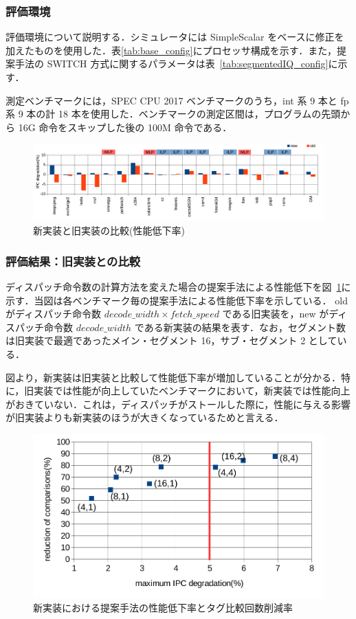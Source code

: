 \documentclass[twocolumn]{jsarticle}
\newcommand{\fig}[1]{{図~\ref{fig:#1}}}
\newcommand{\tab}[1]{{表~\ref{tab:#1}}}
\begin{document}
  \subsubsection{評価環境}
  \label{sec:config}
  評価環境について説明する．シミュレータには SimpleScalar をベースに修正を加えたものを使用した．表\ref{tab:base_config}にプロセッサ構成を示す．また，提案手法の SWITCH 方式に関するパラメータは\tab{segmentedIQ_config}に示す．
  
  測定ベンチマークには，SPEC CPU 2017 ベンチマークのうち，int 系 9 本と fp 系 9 本の計 18 本を使用した．ベンチマークの測定区間は，プログラムの先頭から 16G 命令をスキップした後の 100M 命令である．

  
  \begin{figure}[ht]
    \centering
    \includegraphics[width=0.99\hsize]{old_ipc.pdf}
    \caption{新実装と旧実装の比較(性能低下率)}  
    \label{fig:old_ipc}
  \end{figure}

  \subsubsection{評価結果：旧実装との比較}
  ディスパッチ命令数の計算方法を変えた場合の提案手法による性能低下を\fig{old_ipc}に示す．当図は各ベンチマーク毎の提案手法による性能低下率を示している． old がディスパッチ命令数 $decode\_width \times fetch\_speed$ である旧実装を，new がディスパッチ命令数 $decode\_width$ である新実装の結果を表す．なお，セグメント数は旧実装で最適であったメイン・セグメント 16，サブ・セグメント 2 としている．

  図より，新実装は旧実装と比較して性能低下率が増加していることが分かる．特に，旧実装では性能が向上していたベンチマークにおいて，新実装では性能向上がおきていない．これは，ディスパッチがストールした際に，性能に与える影響が旧実装よりも新実装のほうが大きくなっているためと言える．

  \begin{figure}[ht]
    \centering
    \includegraphics[width=0.99\hsize]{ipc_comp.pdf}
    \caption{新実装における提案手法の性能低下率とタグ比較回数削減率}  
    \label{fig:ipc_comp}
  \end{figure}
  
\end{document}
